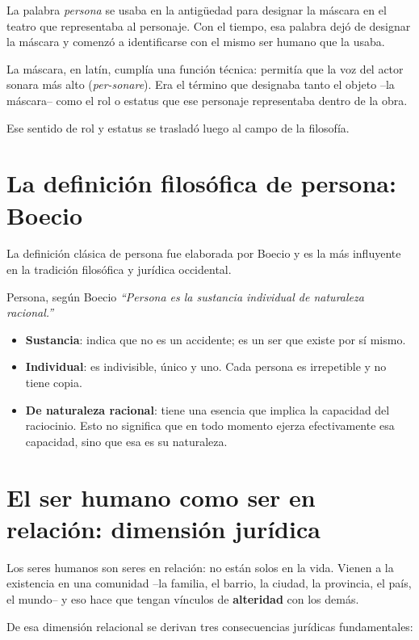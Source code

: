 \documentclass[12pt,oneside]{book}
\begin{document}
La palabra \emph{persona} se usaba en la antigüedad para designar la máscara en el teatro que representaba al personaje. Con el tiempo, esa palabra dejó de designar la máscara y comenzó a identificarse con el mismo ser humano que la usaba.

La máscara, en latín, cumplía una función técnica: permitía que la voz del actor sonara más alto (\emph{per-sonare}). Era el término que designaba tanto el objeto --la máscara-- como el rol o estatus que ese personaje representaba dentro de la obra.

Ese sentido de rol y estatus se trasladó luego al campo de la filosofía.

\section{La definición filosófica de persona: Boecio}

La definición clásica de persona fue elaborada por Boecio y es la más influyente en la tradición filosófica y jurídica occidental.

\begin{definition}{Persona, según Boecio}
\textit{``Persona es la sustancia individual de naturaleza racional.''}

\begin{itemize}
    \item \textbf{Sustancia}: indica que no es un accidente; es un ser que existe por sí mismo.
    \item \textbf{Individual}: es indivisible, único y uno. Cada persona es irrepetible y no tiene copia.
    \item \textbf{De naturaleza racional}: tiene una esencia que implica la capacidad del raciocinio. Esto no significa que en todo momento ejerza efectivamente esa capacidad, sino que esa es su naturaleza.
\end{itemize}
\end{definition}

\section{El ser humano como ser en relación: dimensión jurídica}

Los seres humanos son seres en relación: no están solos en la vida. Vienen a la existencia en una comunidad --la familia, el barrio, la ciudad, la provincia, el país, el mundo-- y eso hace que tengan vínculos de \textbf{alteridad} con los demás.

De esa dimensión relacional se derivan tres consecuencias jurídicas fundamentales:
\end{document}
